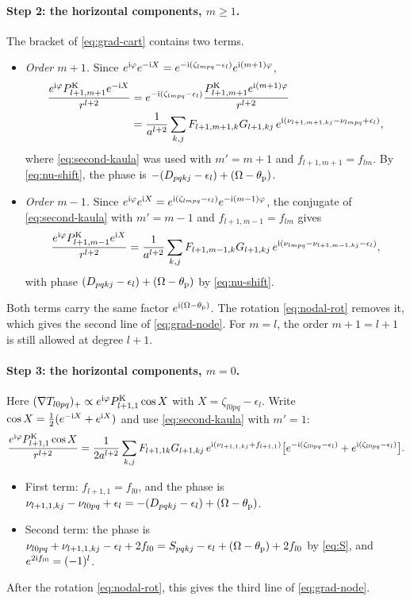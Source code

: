 \paragraph{Step 2: the horizontal components, $m\ge1$.} The bracket of \eqref{eq:grad-cart} contains two terms.
\begin{itemize}
  \item \emph{Order $m+1$.} Since $e^{\mathrm{i}\varphi}e^{-\mathrm{i} X}=e^{-\mathrm{i}(\zeta_{lmpq}-\epsilon_l)}e^{\mathrm{i}(m+1)\varphi}$,
  \begin{align*}
    \frac{e^{\mathrm{i}\varphi}P^{\mathrm K}_{l+1,m+1}e^{-\mathrm{i} X}}{r^{l+2}}&=e^{-\mathrm{i}(\zeta_{lmpq}-\epsilon_l)}\frac{P^{\mathrm K}_{l+1,m+1}e^{\mathrm{i}(m+1)\varphi}}{r^{l+2}}\\
    &=\frac{1}{a^{l+2}}\sum_{k,j}F_{l+1,m+1,k}G_{l+1,kj}\,e^{\mathrm{i}(\nu_{l+1,m+1,kj}-\nu_{lmpq}+\epsilon_l)},
  \end{align*}
  where \eqref{eq:second-kaula} was used with $m'=m+1$ and $f_{l+1,m+1}=f_{lm}$. By \eqref{eq:nu-shift}, the phase is $-(D_{pqkj}-\epsilon_l)+(\Omega-\theta_{\mathrm p})$.
  \item \emph{Order $m-1$.} Since $e^{\mathrm{i}\varphi}e^{\mathrm{i} X}=e^{\mathrm{i}(\zeta_{lmpq}-\epsilon_l)}e^{-\mathrm{i}(m-1)\varphi}$, the conjugate of \eqref{eq:second-kaula} with $m'=m-1$ and $f_{l+1,m-1}=f_{lm}$ gives
  \[
    \frac{e^{\mathrm{i}\varphi}P^{\mathrm K}_{l+1,m-1}e^{\mathrm{i} X}}{r^{l+2}}=\frac{1}{a^{l+2}}\sum_{k,j}F_{l+1,m-1,k}G_{l+1,kj}\,e^{\mathrm{i}(\nu_{lmpq}-\nu_{l+1,m-1,kj}-\epsilon_l)},
  \]
  with phase $(D_{pqkj}-\epsilon_l)+(\Omega-\theta_{\mathrm p})$ by \eqref{eq:nu-shift}.
\end{itemize}
Both terms carry the same factor $e^{\mathrm{i}(\Omega-\theta_{\mathrm p})}$. The rotation \eqref{eq:nodal-rot} removes it, which gives the second line of \eqref{eq:grad-node}. For $m=l$, the order $m+1=l+1$ is still allowed at degree $l+1$.

\paragraph{Step 3: the horizontal components, $m=0$.} Here $(\nabla T_{l0pq})_+\propto e^{\mathrm{i}\varphi}P^{\mathrm K}_{l+1,1}\cos X$ with $X=\zeta_{l0pq}-\epsilon_l$. Write $\cos X=\tfrac12(e^{-\mathrm{i} X}+e^{\mathrm{i} X})$ and use \eqref{eq:second-kaula} with $m'=1$:
\[
  \frac{e^{\mathrm{i}\varphi}P^{\mathrm K}_{l+1,1}\cos X}{r^{l+2}}=\frac{1}{2a^{l+2}}\sum_{k,j}F_{l+1,1k}G_{l+1,kj}\,e^{\mathrm{i}(\nu_{l+1,1,kj}+f_{l+1,1})}\big[e^{-\mathrm{i}(\zeta_{l0pq}-\epsilon_l)}+e^{\mathrm{i}(\zeta_{l0pq}-\epsilon_l)}\big].
\]
\begin{itemize}
  \item First term: $f_{l+1,1}=f_{l0}$, and the phase is $\nu_{l+1,1,kj}-\nu_{l0pq}+\epsilon_l=-(D_{pqkj}-\epsilon_l)+(\Omega-\theta_{\mathrm p})$.
  \item Second term: the phase is $\nu_{l0pq}+\nu_{l+1,1,kj}-\epsilon_l+2f_{l0}=S_{pqkj}-\epsilon_l+(\Omega-\theta_{\mathrm p})+2f_{l0}$ by \eqref{eq:S}, and $e^{2\mathrm{i} f_{l0}}=(-1)^l$.
\end{itemize}
After the rotation \eqref{eq:nodal-rot}, this gives the third line of \eqref{eq:grad-node}.

